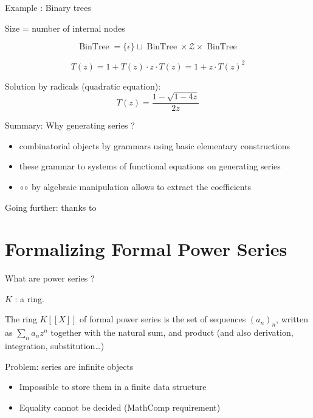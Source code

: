 \documentclass[compress,11pt]{beamer}
\def\opstyle#1{\ensuremath{\operatorname{#1}}}
\newcommand{\BinTree}{\opstyle{BinTree}}
\newcommand{\mZ}{\mathcal{Z}}
\renewcommand{\emph}[1]{{\color{red} #1}}
\begin{document}
\begin{frame}{Example : Binary trees}

  Size = number of internal nodes

  \[\BinTree = \{\epsilon\} \sqcup \BinTree\times\mZ\times\BinTree\]

  \[T(z) = 1 + T(z) \cdot z \cdot T(z) = 1 + z \cdot T(z)^2\]
  \bigskip\pause

  Solution by radicals (quadratic equation):
  \[T(z) = \frac{1 - \sqrt{1-4z}}{2z}\]
\end{frame}

\begin{frame}{Summary: Why generating series ?}

  \begin{NOTE}
    \begin{itemize}
    \item {} combinatorial objects by \emph{grammars} using
      basic elementary constructions
    \item {} these grammar to \emph{systems of functional
        equations} on generating series
    \item «»  by algebraic manipulation allows
      to extract the coefficients
    \end{itemize}
  \end{NOTE}
  \bigskip
  
  Going further:  thanks to 
\end{frame}

\section{Formalizing Formal Power Series}

\begin{frame}{What are power series ?}

  $K$ : a ring.
  \bigskip

  \begin{definition}
    The ring $K[[X]]$ of \emph{formal power series} is the set of sequences
    $(a_n)_n$, written as $\sum_n a_n z^n$ together with the natural sum, and
    product (and also derivation, integration, substitution\dots)
  \end{definition}
  \pause\bigskip

  Problem: series are infinite objects
  \begin{itemize}
  \item Impossible to store them in a finite data structure
    \medskip

  \item Equality cannot be decided (MathComp requirement)
  \end{itemize}
\end{frame}
\end{document}
